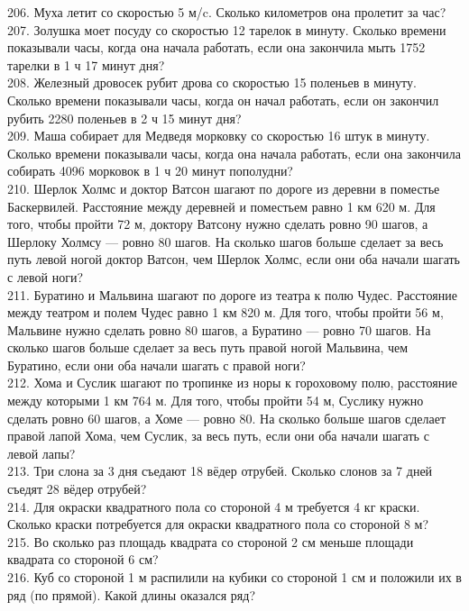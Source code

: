 \documentclass[12pt]{article}
\begin{document}
206. Муха летит со скоростью 5 м/c. Сколько километров она пролетит за час?\\
207. Золушка моет посуду со скоростью 12 тарелок в минуту. Сколько времени показывали часы, когда она начала работать, если она закончила мыть 1752 тарелки в 1 ч 17 минут дня?\\
208. Железный дровосек рубит дрова со скоростью 15 поленьев в минуту. Сколько времени показывали часы, когда он начал работать, если он закончил рубить 2280 поленьев в 2 ч 15 минут дня?\\
209. Маша собирает для Медведя морковку со скоростью 16 штук в минуту. Сколько времени показывали часы, когда она начала работать, если она закончила собирать 4096 морковок в 1 ч 20 минут пополудни?\\
210. Шерлок Холмс и доктор Ватсон шагают по дороге из деревни в поместье Баскервилей. Расстояние между деревней и поместьем равно 1 км 620 м. Для того, чтобы пройти 72 м, доктору Ватсону нужно сделать ровно 90 шагов, а Шерлоку Холмсу --- ровно 80 шагов. На сколько шагов больше сделает за весь путь левой ногой доктор Ватсон, чем Шерлок Холмс, если они оба начали шагать с левой ноги?\\
211. Буратино и Мальвина шагают по дороге из театра к полю Чудес. Расстояние между театром и полем Чудес равно 1 км 820 м. Для того, чтобы пройти 56 м, Мальвине нужно сделать ровно 80 шагов, а Буратино --- ровно 70 шагов. На сколько шагов больше сделает за весь путь правой ногой Мальвина, чем Буратино, если они оба начали шагать с правой ноги?\\
212. Хома и Суслик шагают по тропинке из норы к гороховому полю, расстояние между которыми 1 км 764 м. Для того, чтобы пройти 54 м, Суслику нужно сделать ровно 60 шагов, а Хоме --- ровно 80. На сколько больше шагов сделает правой лапой Хома, чем Суслик, за весь путь, если они оба начали шагать с левой лапы?\\
213. Три слона за 3 дня съедают 18 вёдер отрубей. Сколько слонов за 7 дней съедят 28 вёдер отрубей?\\
214. Для окраски квадратного пола со стороной 4 м требуется 4 кг краски. Сколько краски потребуется для окраски квадратного пола со стороной 8 м?\\
215. Во сколько раз площадь квадрата со стороной 2 см меньше площади квадрата со стороной 6 см?\\
216. Куб со стороной 1 м распилили на кубики со стороной 1 см и положили их в ряд (по прямой). Какой длины оказался ряд?\\
\end{document}
